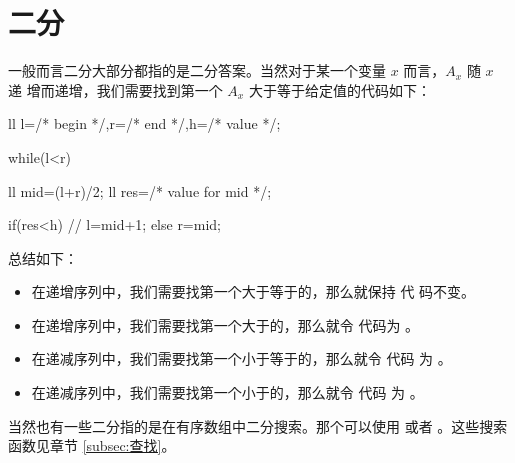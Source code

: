 \section{二分}
\label{sec:二分}

一般而言二分大部分都指的是二分答案。当然对于某一个变量 $x$ 而言，$A_x$ 随 $x$ 递
增而递增，我们需要找到第一个 $A_x$ 大于等于给定值的代码如下：
\begin{Cpp}[texcl]
ll l=/* begin */,r=/* end */,h=/* value */;

while(l<r){
  ll mid=(l+r)/2;
  ll res=/* value for mid */;

  if(res<h){ // 
    l=mid+1;
  }else{
    r=mid;
  }
}
\end{Cpp}

总结如下：
\begin{itemize}
    \item 在递增序列中，我们需要找第一个大于等于的，那么就保持  代
        码不变。
    \item 在递增序列中，我们需要找第一个大于的，那么就令  代码为
        。
    \item 在递减序列中，我们需要找第一个小于等于的，那么就令  代码
        为 。
    \item 在递减序列中，我们需要找第一个小于的，那么就令  代码
        为 。
\end{itemize}

当然也有一些二分指的是在有序数组中二分搜索。那个可以使用  或者
。这些搜索函数见章节 \ref{subsec:查找}。
